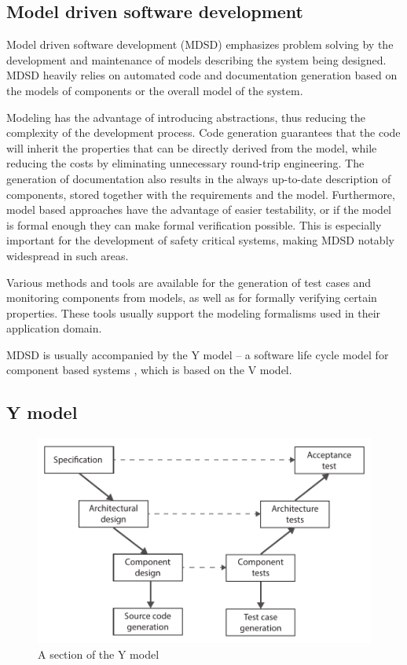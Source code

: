\subsection{Model driven software development}

Model driven software development (MDSD) emphasizes problem solving by the development and maintenance of models describing the system being designed. MDSD heavily relies on automated code and documentation generation based on the models of components or the overall model of the system. 

Modeling has the advantage of introducing abstractions, thus reducing the complexity of the development process. Code generation guarantees that the code will inherit the properties that can be directly derived from the model, while reducing the costs by eliminating unnecessary round-trip engineering. The generation of documentation also results in the always up-to-date description of components, stored together with the requirements and the model. Furthermore, model based approaches have the advantage of easier testability, or if the model is formal enough they can make formal verification possible. This is especially important for the development of safety critical systems, making MDSD notably widespread in such areas.

Various methods and tools are available for the generation of test cases and monitoring components from models, as well as for formally verifying certain properties. These tools usually support the modeling formalisms used in their application domain.

MDSD is usually accompanied by the Y model -- a software life cycle model for component based systems \citep{ymodel}, which is based on the V model.

\subsection{Y model} %

\begin{figure}[h]
	\centering
	\includegraphics[width=0.8\linewidth]{include/figures/chapter_1/YModel}
	\caption{A section of the Y model}
	\label{fig:intro:vmodel}
\end{figure}

